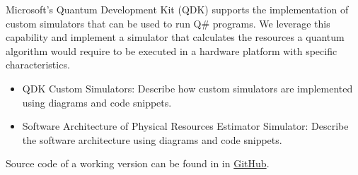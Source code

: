 Microsoft's Quantum Development Kit (QDK) supports the implementation of custom simulators that can be used to run Q\# programs. We leverage this capability and implement a simulator that calculates the resources a quantum algorithm would require to be executed in a hardware platform with specific characteristics.

\begin{itemize}
    \item QDK Custom Simulators: Describe how custom simulators are implemented using diagrams and code snippets.
    \item Software Architecture of Physical Resources Estimator Simulator: Describe the software architecture using diagrams and code snippets.
\end{itemize}

Source code of a working version can be found in in \href{https://github.com/cesarzc/uw-master-in-physics-project}{GitHub}.
